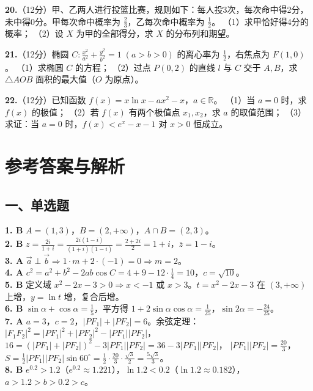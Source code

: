 \documentclass[12pt,a4paper]{ctexart}
\begin{document}
\vspace{8cm}

\textbf{20.}（12分）甲、乙两人进行投篮比赛，规则如下：每人投3次，每次命中得2分，未中得0分。甲每次命中概率为 $\frac23$，乙每次命中概率为 $\frac12$。
（1）求甲恰好得4分的概率；
（2）设 $X$ 为甲的全部得分，求 $X$ 的分布列和期望。

\vspace{8cm}

\textbf{21.}（12分）椭圆 $C:\frac{x^2}{a^2}+\frac{y^2}{b^2}=1\;(a>b>0)$ 的离心率为 $\frac12$，右焦点为 $F(1,0)$。
（1）求椭圆 $C$ 的方程；
（2）过点 $P(0,2)$ 的直线 $l$ 与 $C$ 交于 $A,B$，求 $\triangle AOB$ 面积的最大值（$O$ 为原点）。

\vspace{8cm}

\textbf{22.}（12分）已知函数 $f(x)=x\ln x - ax^2 - x$，$a\in\mathbb{R}$。
（1）当 $a=0$ 时，求 $f(x)$ 的极值；
（2）若 $f(x)$ 有两个极值点 $x_1,x_2$，求 $a$ 的取值范围；
（3）求证：当 $a=0$ 时，$f(x) < e^x - x - 1$ 对 $x>0$ 恒成立。

\newpage
\section*{参考答案与解析}

\subsection*{一、单选题}
\textbf{1. B} $A=(1,3)$，$B=(2,+\infty)$，$A\cap B=(2,3)$。\\
\textbf{2. B} $z=\frac{2i}{1+i}=\frac{2i(1-i)}{(1+i)(1-i)}=\frac{2+2i}{2}=1+i$，$\bar{z}=1-i$。\\
\textbf{3. A} $\vec{a}\perp\vec{b}\Rightarrow 1\cdot m+2\cdot(-1)=0\Rightarrow m=2$。\\
\textbf{4. A} $c^2=a^2+b^2-2ab\cos C=4+9-12\cdot\frac14=10$，$c=\sqrt{10}$。\\
\textbf{5. B} 定义域 $x^2-2x-3>0\Rightarrow x<-1$ 或 $x>3$。$t=x^2-2x-3$ 在 $(3,+\infty)$ 上增，$y=\ln t$ 增，复合后增。\\
\textbf{6. B} $\sin\alpha+\cos\alpha=\frac15$，平方得 $1+2\sin\alpha\cos\alpha=\frac1{25}$，$\sin2\alpha=-\frac{24}{25}$。\\
\textbf{7. A} $a=3$，$c=2$，$|PF_1|+|PF_2|=6$。余弦定理：
$|F_1F_2|^2=|PF_1|^2+|PF_2|^2-|PF_1||PF_2|$，
$16=(|PF_1|+|PF_2|)^2-3|PF_1||PF_2|=36-3|PF_1||PF_2|$，
$|PF_1||PF_2|=\frac{20}{3}$，$S=\frac12|PF_1||PF_2|\sin60^\circ=\frac12\cdot\frac{20}{3}\cdot\frac{\sqrt3}{2}=\frac{5\sqrt3}{3}$。\\
\textbf{8. B} $e^{0.2}>1.2$（$e^{0.2}\approx1.221$），$\ln1.2<0.2$（$\ln1.2\approx0.182$），$a>1.2>b>0.2>c$。
\end{document}
